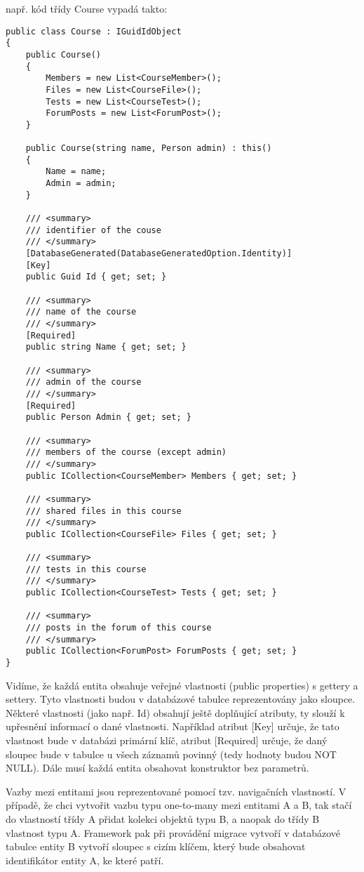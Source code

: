 \newpage

např. kód třídy Course vypadá takto:

\begin{lstlisting}
public class Course : IGuidIdObject
{
	public Course()
	{
		Members = new List<CourseMember>();
		Files = new List<CourseFile>();
		Tests = new List<CourseTest>();
		ForumPosts = new List<ForumPost>();
	}
	
	public Course(string name, Person admin) : this()
	{
		Name = name;
		Admin = admin;
	}
	
	/// <summary>
	/// identifier of the couse
	/// </summary>
	[DatabaseGenerated(DatabaseGeneratedOption.Identity)]
	[Key]
	public Guid Id { get; set; }
	
	/// <summary>
	/// name of the course
	/// </summary>
	[Required]
	public string Name { get; set; }
	
	/// <summary>
	/// admin of the course
	/// </summary>
	[Required]
	public Person Admin { get; set; }
	
	/// <summary>
	/// members of the course (except admin)
	/// </summary>
	public ICollection<CourseMember> Members { get; set; }
	
	/// <summary>
	/// shared files in this course
	/// </summary>
	public ICollection<CourseFile> Files { get; set; }
	
	/// <summary>
	/// tests in this course
	/// </summary>
	public ICollection<CourseTest> Tests { get; set; }
	
	/// <summary>
	/// posts in the forum of this course
	/// </summary>
	public ICollection<ForumPost> ForumPosts { get; set; }
}
\end{lstlisting}

Vidíme, že každá entita obsahuje veřejné vlastnosti (public properties) s gettery a settery. Tyto vlastnosti budou v databázové tabulce reprezentovány jako sloupce. Některé vlastnosti (jako např. Id) obsahují ještě doplňující atributy, ty slouží k upřesnění informací o dané vlastnosti. Například atribut [Key] určuje, že tato vlastnost bude v databázi primární klíč, atribut [Required] určuje, že daný sloupec bude v tabulce u všech záznamů povinný (tedy hodnoty budou NOT NULL).
Dále musí každá entita obsahovat konstruktor bez parametrů.

Vazby mezi entitami jsou reprezentované pomocí tzv. navigačních vlastností. V případě, že chci vytvořit vazbu typu one-to-many mezi entitami A a B, tak stačí do vlastností třídy A přidat kolekci objektů typu B, a naopak do třídy B vlastnost typu A. Framework pak při provádění migrace vytvoří v databázové tabulce entity B vytvoří sloupec s cizím klíčem, který bude obsahovat identifikátor entity A, ke které patří.


